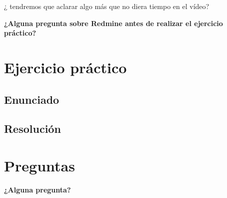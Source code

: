 \documentclass[
xcolor={svgnames},
hyperref={colorlinks,citecolor=DeepPink4,linkcolor=Black,urlcolor=DarkBlue}
]{beamer}
\begin{document}
\begin{frame}
	¿ tendremos que aclarar algo más que no diera tiempo en el vídeo?
\end{frame}

\begin{frame}
	\begin{center}

		{\Large 		\textbf{¿Alguna pregunta sobre Redmine antes de realizar el ejercicio práctico?}}

	\end{center}

\end{frame}

\section{Ejercicio práctico}

\subsection{Enunciado}
\begin{frame}

\end{frame}

\subsection{Resolución}

\begin{frame}

\end{frame}

\section{Preguntas}

\begin{frame}
	\begin{center}
		{\Large 		\textbf{¿Alguna pregunta?}}
	\end{center}
\end{frame}

%
%	
%	 
%
%

\begin{frame}[plain]
	\titlepage
\end{frame}
\end{document}
